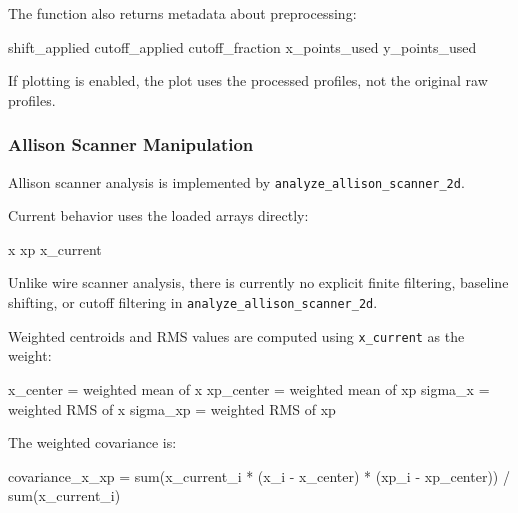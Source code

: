 \documentclass[
]{article}
\newenvironment{Shaded}{}{}
\newcommand{\NormalTok}[1]{#1}
\begin{document}
The function also returns metadata about preprocessing:

\begin{Shaded}
\begin{Highlighting}[]
\NormalTok{shift\_applied}
\NormalTok{cutoff\_applied}
\NormalTok{cutoff\_fraction}
\NormalTok{x\_points\_used}
\NormalTok{y\_points\_used}
\end{Highlighting}
\end{Shaded}

If plotting is enabled, the plot uses the processed profiles, not the
original raw profiles.

\hypertarget{allison-scanner-manipulation}{%
\subsubsection{Allison Scanner
Manipulation}\label{allison-scanner-manipulation}}

Allison scanner analysis is implemented by
\texttt{analyze\_allison\_scanner\_2d}.

Current behavior uses the loaded arrays directly:

\begin{Shaded}
\begin{Highlighting}[]
\NormalTok{x}
\NormalTok{xp}
\NormalTok{x\_current}
\end{Highlighting}
\end{Shaded}

Unlike wire scanner analysis, there is currently no explicit finite
filtering, baseline shifting, or cutoff filtering in
\texttt{analyze\_allison\_scanner\_2d}.

Weighted centroids and RMS values are computed using \texttt{x\_current}
as the weight:

\begin{Shaded}
\begin{Highlighting}[]
\NormalTok{x\_center  = weighted mean of x}
\NormalTok{xp\_center = weighted mean of xp}
\NormalTok{sigma\_x   = weighted RMS of x}
\NormalTok{sigma\_xp  = weighted RMS of xp}
\end{Highlighting}
\end{Shaded}

The weighted covariance is:

\begin{Shaded}
\begin{Highlighting}[]
\NormalTok{covariance\_x\_xp =}
\NormalTok{    sum(x\_current\_i * (x\_i {-} x\_center) * (xp\_i {-} xp\_center))}
\NormalTok{    / sum(x\_current\_i)}
\end{Highlighting}
\end{Shaded}
\end{document}
